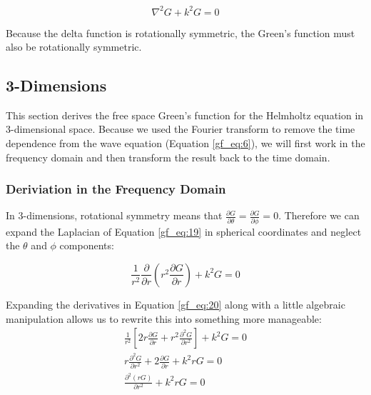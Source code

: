 \begin{equation}
\nabla^2G+ k^2G = 0
\label{gf_eq:19}
\end{equation}
\renewcommand{\baselinestretch}{2} \small\normalsize

Because the delta function is rotationally symmetric, the Green's function must also be rotationally symmetric.

\subsection{3-Dimensions}\label{gf_sec:3d}
This section derives the free space Green's function for the Helmholtz equation in 3-dimensional space. Because we used the Fourier transform to remove the time dependence from the wave equation (Equation 
\ref{gf_eq:6}), we will first work in the frequency domain and then transform the result back to the time domain.

\subsubsection{Deriviation in the Frequency Domain}
In 3-dimensions,  rotational symmetry means that  $\frac{\partial G}{\partial\theta} = \frac{\partial G}{\partial\phi}=0$. Therefore we can expand the Laplacian of Equation \ref{gf_eq:19} in spherical coordinates and neglect the $\theta$ and $\phi$ components:

\begin{equation}
\frac{1}{r^2}\frac{\partial}{\partial r}\left(r^2\frac{\partial G}{\partial r}\right)+ k^2G = 0
\label{gf_eq:20}
\end{equation}
\renewcommand{\baselinestretch}{2} \small\normalsize

Expanding the derivatives in Equation \ref{gf_eq:20} along with a little algebraic manipulation allows us to rewrite this into something more manageable:
\begin{equation}
\begin{gathered}
\frac{1}{r^2}\left[2r\frac{\partial G}{\partial r}+ r^2\frac{\partial^2 G}{\partial r^2}  \right] + k^2G = 0 \\
r\frac{\partial^2 G}{\partial r^2} + 2\frac{\partial G}{\partial r}+ k^2rG = 0 \\
\frac{\partial^2 \left(rG\right)}{\partial r^2} + k^2rG = 0
\end{gathered}
\label{gf_eq:21}
\end{equation}
\renewcommand{\baselinestretch}{2} \small\normalsize

